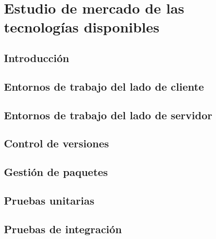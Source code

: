 \documentclass[
  a4paper,  %
  twoside,  %
  bibliography=totoc,
  headsepline,
  cleardoublepage=empty,
  parskip=half,
  draft=false
]{scrbook}
\begin{document}

\chapter{Estudio de mercado de las tecnologías disponibles}
\label{chap:techMarketResearch}

\section{Introducción}



\section{Entornos de trabajo del lado de cliente}



\section{Entornos de trabajo del lado de servidor}



\section{Control de versiones}



\section{Gestión de paquetes}


\label{section:packet-manager}

\section{Pruebas unitarias}
\label{section:unit-testing}



\section{Pruebas de integración}
\label{section:integration-testing}


\end{document}
